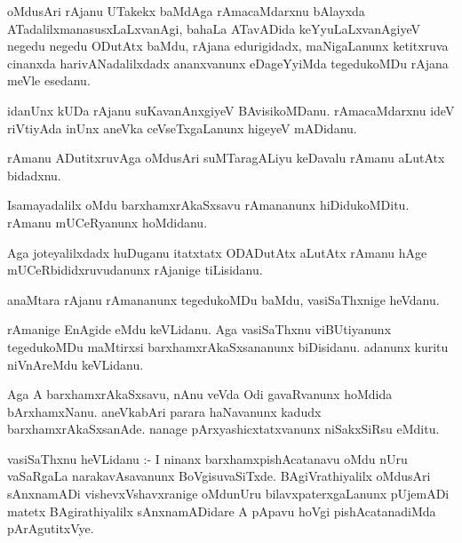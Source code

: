 \documentclass{article}
\begin{document}
\begin{mn}
oMdusAri  rAjanu  UTakekx  baMdAga  rAmacaMdarxnu  bAlayxda  ATadalilxmanasusxLaLxvanAgi,  bahaLa  ATavADida  
keYyuLaLxvanAgiyeV  negedu negedu  ODutAtx  baMdu,  rAjana  edurigidadx,  maNigaLanunx  ketitxruva  cinanxda  
harivANadalilxdadx  ananxvanunx  eDageYyiMda  tegedukoMDu  rAjana  meVle  esedanu.
\end{mn}

\begin{mn}
idanUnx  kUDa  rAjanu  suKavanAnxgiyeV  BAvisikoMDanu.  rAmacaMdarxnu  ideV  riVtiyAda  inUnx  aneVka  
ceVseTxgaLanunx  higeyeV  mADidanu.
\end{mn}

\begin{mn}
rAmanu  ADutitxruvAga  oMdusAri  suMTaragALiyu  keDavalu  rAmanu  aLutAtx  bidadxnu.
\end{mn}

\begin{mn}
Isamayadalilx  oMdu  barxhamxrAkaSxsavu  rAmananunx  hiDidukoMDitu.  rAmanu  mUCeRyanunx  hoMdidanu.
\end{mn}

\begin{mn}
Aga  joteyalilxdadx  huDuganu  itatxtatx  ODADutAtx  aLutAtx  rAmanu  hAge  mUCeRbididxruvudanunx  rAjanige  tiLisidanu.
\end{mn}

\begin{mn}
anaMtara  rAjanu  rAmananunx  tegedukoMDu  baMdu,  vasiSaThxnige  heVdanu.
\end{mn}

\begin{mn}
rAmanige  EnAgide  eMdu  keVLidanu.  Aga  vasiSaThxnu  viBUtiyanunx  tegedukoMDu  maMtirxsi  
barxhamxrAkaSxsananunx   biDisidanu.  adanunx  kuritu  niVnAreMdu  keVLidanu.
\end{mn}

\begin{mn}
Aga  A  barxhamxrAkaSxsavu,  nAnu  veVda  Odi  gavaRvanunx  hoMdida  bArxhamxNanu.  aneVkabAri  parara  
haNavanunx  kadudx  barxhamxrAkaSxsanAde.  nanage  pArxyashicxtatxvanunx  niSakxSiRsu  eMditu.
\end{mn}

\begin{mn}
vasiSaThxnu  heVLidanu :- I ninanx  barxhamxpishAcatanavu  oMdu  nUru  vaSaRgaLa  narakavAsavanunx  
BoVgisuvaSiTxde.  BAgiVrathiyalilx  oMdusAri  sAnxnamADi  vishevxVshavxranige  oMdunUru  bilavxpaterxgaLanunx  
pUjemADi  matetx  BAgirathiyalilx  sAnxnamADidare  A  pApavu  hoVgi  pishAcatanadiMda  pArAgutitxVye.
\end{mn}
\end{document}
